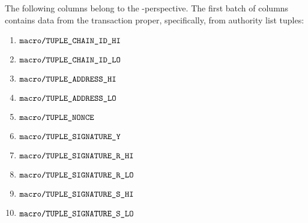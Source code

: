 The following columns belong to the \macro-perspective.
The first batch of columns contains data from the
transaction proper, specifically, from authority list tuples:
\begin{enumerate}
	\item $\rlpAuthMacroChainIdHi$
	\item $\rlpAuthMacroChainIdLo$
	\item $\rlpAuthMacroAddressHi$
	\item $\rlpAuthMacroAddressLo$
	\item $\rlpAuthMacroNonce$
	\item $\rlpAuthMacroSignatureYparity$
	\item $\rlpAuthMacroSignatureRhi$
	\item $\rlpAuthMacroSignatureRlo$
	\item $\rlpAuthMacroSignatureShi$
	\item $\rlpAuthMacroSignatureSlo$
\end{enumerate}
